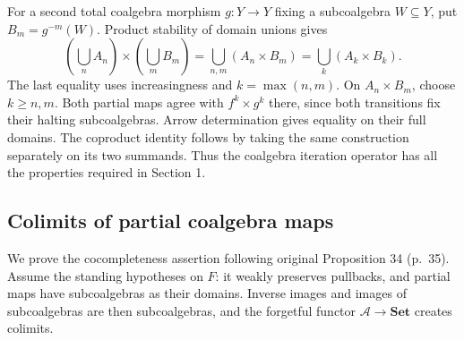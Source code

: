 \documentclass[11pt]{article}
\begin{document}
For a second total coalgebra morphism $g:Y\to Y$ fixing a subcoalgebra $W\subseteq Y$, put $B_m=g^{-m}(W)$. Product stability of domain unions gives
\[
\left(\bigcup_n A_n\right)\times\left(\bigcup_m B_m\right)
 =\bigcup_{n,m}(A_n\times B_m)
 =\bigcup_k(A_k\times B_k).
\]
The last equality uses increasingness and $k=\max(n,m)$. On $A_n\times B_m$, choose $k\geq n,m$. Both partial maps agree with $f^k\times g^k$ there, since both transitions fix their halting subcoalgebras. Arrow determination gives equality on their full domains. The coproduct identity follows by taking the same construction separately on its two summands. Thus the coalgebra iteration operator has all the properties required in Section 1.

\subsection{Colimits of partial coalgebra maps}
We prove the cocompleteness assertion following original Proposition 34 (p.~35). Assume the standing hypotheses on $F$: it weakly preserves pullbacks, and partial maps have subcoalgebras as their domains. Inverse images and images of subcoalgebras are then subcoalgebras, and the forgetful functor $\mathcal A\to\mathbf{Set}$ creates colimits.
\end{document}
